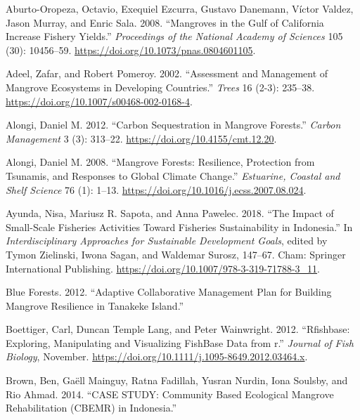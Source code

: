 \documentclass[
]{article}
\newlength{\cslhangindent}
\newenvironment{CSLReferences}[2] %
 {\begin{list}{}{%
  \setlength{\itemindent}{0pt}
  \setlength{\leftmargin}{0pt}
  \setlength{\parsep}{0pt}
  \ifodd #1
   \setlength{\leftmargin}{\cslhangindent}
   \setlength{\itemindent}{-1\cslhangindent}
  \fi
  \setlength{\itemsep}{#2\baselineskip}}}
 {\end{list}}
\begin{document}
\label{refs}
\begin{CSLReferences}{1}{0}
Aburto-Oropeza, Octavio, Exequiel Ezcurra, Gustavo Danemann, Víctor Valdez, Jason Murray, and Enric Sala. 2008. {``Mangroves in the {Gulf} of {California} Increase Fishery Yields.''} \emph{Proceedings of the National Academy of Sciences} 105 (30): 10456--59. \url{https://doi.org/10.1073/pnas.0804601105}.

Adeel, Zafar, and Robert Pomeroy. 2002. {``Assessment and Management of Mangrove Ecosystems in Developing Countries.''} \emph{Trees} 16 (2-3): 235--38. \url{https://doi.org/10.1007/s00468-002-0168-4}.

Alongi, Daniel M. 2012. {``Carbon Sequestration in Mangrove Forests.''} \emph{Carbon Management} 3 (3): 313--22. \url{https://doi.org/10.4155/cmt.12.20}.

Alongi, Daniel M. 2008. {``Mangrove Forests: {Resilience}, Protection from Tsunamis, and Responses to Global Climate Change.''} \emph{Estuarine, Coastal and Shelf Science} 76 (1): 1--13. \url{https://doi.org/10.1016/j.ecss.2007.08.024}.

Ayunda, Nisa, Mariusz R. Sapota, and Anna Pawelec. 2018. {``The {Impact} of {Small-Scale Fisheries Activities Toward Fisheries Sustainability} in {Indonesia}.''} In \emph{Interdisciplinary {Approaches} for {Sustainable Development Goals}}, edited by Tymon Zielinski, Iwona Sagan, and Waldemar Surosz, 147--67. Cham: Springer International Publishing. \url{https://doi.org/10.1007/978-3-319-71788-3_11}.

Blue Forests. 2012. {``Adaptive {Collaborative} {Management} {Plan} for {Building} {Mangrove} {Resilience} in {Tanakeke} {Island}.''}

Boettiger, Carl, Duncan Temple Lang, and Peter Wainwright. 2012. {``Rfishbase: Exploring, Manipulating and Visualizing {FishBase} Data from r.''} \emph{Journal of Fish Biology}, November. \url{https://doi.org/10.1111/j.1095-8649.2012.03464.x}.

Brown, Ben, Gaëll Mainguy, Ratna Fadillah, Yusran Nurdin, Iona Soulsby, and Rio Ahmad. 2014. {``{CASE STUDY}: {Community Based Ecological Mangrove Rehabilitation} ({CBEMR}) in {Indonesia}.''}


\end{CSLReferences}
\end{document}
